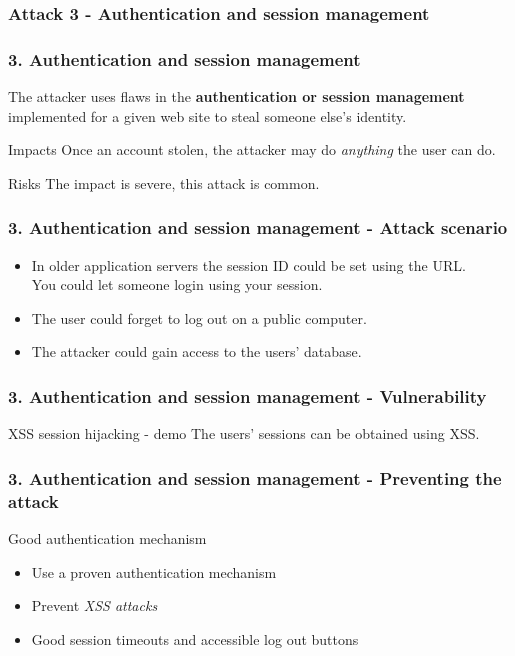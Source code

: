 \subsubsection{Attack 3 - Authentication and session management}

\begin{frame}
\frametitle{3. Authentication and session management}
The attacker uses flaws in the \textbf{authentication or session management}
implemented for a given web site to steal someone else's identity.
\begin{block}{Impacts}
Once an account stolen, the attacker may do \emph{anything} the user can do.
\end{block}
\begin{block}{Risks}
The impact is \alert{severe}, this attack is common.
\end{block}
\end{frame}

\begin{frame}
\frametitle{3. Authentication and session management - Attack scenario}
\begin{itemize}
\item In older application servers the session ID could be set using the URL.
	\\ You could let someone login using your session.
\item The user could forget to log out on a public computer.
\item The attacker could gain access to the users' database.
\end{itemize}
\end{frame}

\begin{frame}
\frametitle{3. Authentication and session management - Vulnerability}
\begin{exampleblock}{XSS session hijacking - demo}
The users' sessions can be obtained using XSS.
\end{exampleblock}
\end{frame}

\begin{frame}
\frametitle{3. Authentication and session management - Preventing the attack}
\begin{block}{Good authentication mechanism}
\begin{itemize}
\item Use a proven authentication mechanism
\item Prevent \emph{XSS attacks}
\item Good session timeouts and accessible log out buttons
\end{itemize}
\end{block}
\end{frame}

